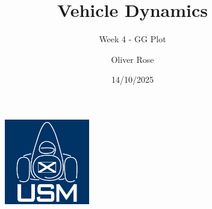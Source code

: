 \documentclass{beamer}
\title{Vehicle Dynamics}
\subtitle{Week 4 - GG Plot}
\author{Oliver Rose}
\institute{University of Strathclyde Motorsport}
\date{14/10/2025}
\begin{document}
\begin{frame}
    \maketitle
\end{frame}




\begin{frame}[focus]
    \begin{figure}
        \includegraphics[width=0.33\textwidth]{../../res/usm-logo.png}
    \end{figure}
\end{frame}
\end{document}
